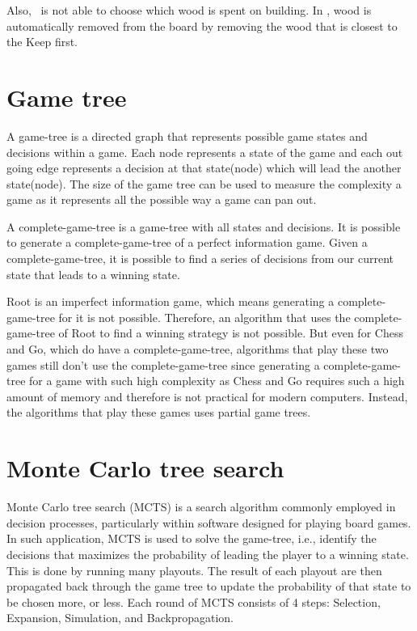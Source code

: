 Also, \Marquise \ is not able to choose which wood is spent on building. In \RootV, wood is automatically removed from the board by removing the wood that is closest to the Keep first. 

\section{Game tree}
A \Gls{game-tree} is a directed graph that represents possible game states and decisions within a game. Each node represents a state of the game and each out going edge represents a decision at that state(node) which will lead the another state(node). The size of the game tree can be used to measure the complexity a game as it represents all the possible way a game can pan out. 

A \Gls{complete-game-tree} is a \Gls{game-tree} with all states and decisions. It is possible to generate a \Gls{complete-game-tree} of a perfect information game. Given a \Gls{complete-game-tree}, it is possible to find a series of decisions from our current state that leads to a winning state. 

Root is an imperfect information game, which means generating a \Gls{complete-game-tree} for it is not possible. Therefore, an algorithm that uses the \Gls{complete-game-tree} of Root to find a winning strategy is not possible. But even for Chess and Go, which do have a \Gls{complete-game-tree}, algorithms that play these two games still don't use the \Gls{complete-game-tree} since generating a \Gls{complete-game-tree} for a game with such high complexity as Chess and Go requires such a high amount of memory and therefore is not practical for modern computers. Instead, the algorithms that play these games uses partial game trees.


\section{Monte Carlo tree search} %
Monte Carlo tree search (MCTS) is a search algorithm commonly employed in decision processes, particularly within software designed for playing board games. In such application, MCTS is used to solve the \Gls{game-tree}, i.e., identify the decisions that maximizes the probability of leading the player to a winning state. This is done by running many \Gls{playout}s. The result of each \Gls{playout} are then propagated back through the game tree to update the probability of that state to be chosen more, or less. Each round of MCTS consists of 4 steps: Selection, Expansion, Simulation, and Backpropagation.


